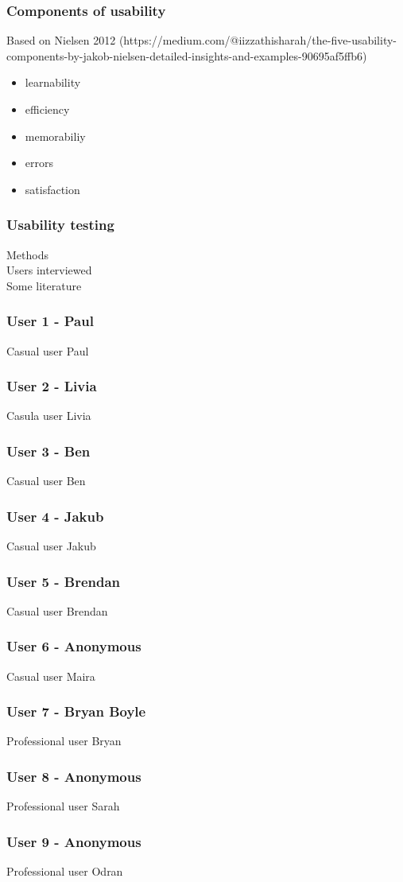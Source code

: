 \subsubsection{Components of usability}
Based on Nielsen 2012 (https://medium.com/@iizzathisharah/the-five-usability-components-by-jakob-nielsen-detailed-insights-and-examples-90695af5ffb6)

\begin{itemize}
    \item learnability
    \item efficiency
    \item memorabiliy
    \item errors
    \item satisfaction
\end{itemize}

\newpage
\subsubsection{Usability testing}
Methods\\
Users interviewed\\
Some literature\\

\newpage
\subsubsection{User 1 - Paul}
Casual user Paul

\newpage
\subsubsection{User 2 - Livia}
Casula user Livia

\newpage
\subsubsection{User 3 - Ben}
Casual user Ben

\newpage
\subsubsection{User 4 - Jakub}
Casual user Jakub

\newpage
\subsubsection{User 5 - Brendan}
Casual user Brendan

\newpage
\subsubsection{User 6 - Anonymous}
Casual user Maira

\newpage
\subsubsection{User 7 - Bryan Boyle}
Professional user Bryan

\newpage
\subsubsection{User 8 - Anonymous}
Professional user Sarah

\newpage
\subsubsection{User 9 - Anonymous}
Professional user Odran
